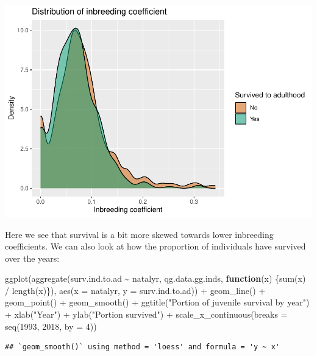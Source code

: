 \documentclass[
]{article}
\newenvironment{Shaded}{\begin{snugshade}}{\end{snugshade}}
\newcommand{\AttributeTok}[1]{\textcolor[rgb]{0.77,0.63,0.00}{#1}}
\newcommand{\ControlFlowTok}[1]{\textcolor[rgb]{0.13,0.29,0.53}{\textbf{#1}}}
\newcommand{\DecValTok}[1]{\textcolor[rgb]{0.00,0.00,0.81}{#1}}
\newcommand{\FunctionTok}[1]{\textcolor[rgb]{0.00,0.00,0.00}{#1}}
\newcommand{\NormalTok}[1]{#1}
\newcommand{\SpecialCharTok}[1]{\textcolor[rgb]{0.00,0.00,0.00}{#1}}
\newcommand{\StringTok}[1]{\textcolor[rgb]{0.31,0.60,0.02}{#1}}
\begin{document}
\includegraphics{EDA_files/figure-latex/unnamed-chunk-8-1.pdf}

Here we see that survival is a bit more skewed towards lower inbreeding
coefficients. We can also look at how the proportion of individuals have
survived over the years:

\begin{Shaded}
\begin{Highlighting}[]
\FunctionTok{ggplot}\NormalTok{(}\FunctionTok{aggregate}\NormalTok{(surv.ind.to.ad }\SpecialCharTok{\textasciitilde{}}\NormalTok{ natalyr, qg.data.gg.inds,}
                 \ControlFlowTok{function}\NormalTok{(x) \{}\FunctionTok{sum}\NormalTok{(x) }\SpecialCharTok{/} \FunctionTok{length}\NormalTok{(x)\}),}
       \FunctionTok{aes}\NormalTok{(}\AttributeTok{x =}\NormalTok{ natalyr, }\AttributeTok{y =}\NormalTok{ surv.ind.to.ad)) }\SpecialCharTok{+}
  \FunctionTok{geom\_line}\NormalTok{() }\SpecialCharTok{+}
  \FunctionTok{geom\_point}\NormalTok{() }\SpecialCharTok{+}
  \FunctionTok{geom\_smooth}\NormalTok{() }\SpecialCharTok{+}
  \FunctionTok{ggtitle}\NormalTok{(}\StringTok{"Portion of juvenile survival by year"}\NormalTok{) }\SpecialCharTok{+}
  \FunctionTok{xlab}\NormalTok{(}\StringTok{"Year"}\NormalTok{) }\SpecialCharTok{+}
  \FunctionTok{ylab}\NormalTok{(}\StringTok{"Portion survived"}\NormalTok{) }\SpecialCharTok{+}
  \FunctionTok{scale\_x\_continuous}\NormalTok{(}\AttributeTok{breaks =} \FunctionTok{seq}\NormalTok{(}\DecValTok{1993}\NormalTok{, }\DecValTok{2018}\NormalTok{, }\AttributeTok{by =} \DecValTok{4}\NormalTok{))}
\end{Highlighting}
\end{Shaded}

\begin{verbatim}
## `geom_smooth()` using method = 'loess' and formula = 'y ~ x'
\end{verbatim}
\end{document}
